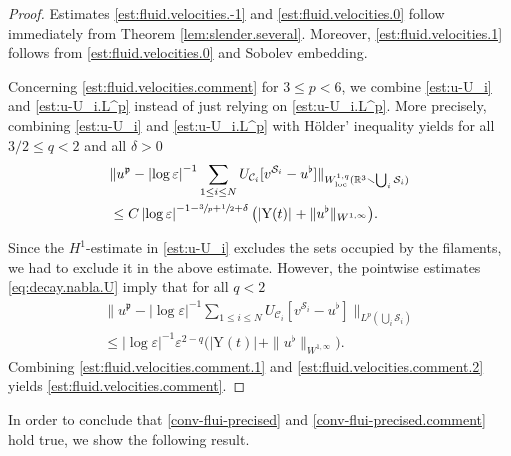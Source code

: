 \documentclass[10pt]{amsart}
\newcommand{\R}{\mathbb{R}}
\let\eps\varepsilon
\newcommand{\loc}{\mathrm{loc}}
\newcommand{\rY}{\mathrm{Y}}
\theoremstyle{definition}
\theoremstyle{remark}
\let\oldbigcup\bigcup
\begin{document}
\begin{proof}
Estimates \eqref{est:fluid.velocities.-1} and \eqref{est:fluid.velocities.0} follow immediately from Theorem \ref{lem:slender.several}. Moreover, \eqref{est:fluid.velocities.1} follows from \eqref{est:fluid.velocities.0} and Sobolev embedding.

Concerning \eqref{est:fluid.velocities.comment} for $3 \leq p < 6$,
we combine \eqref{est:u-U_i} and \eqref{est:u-U_i.L^p} instead of just relying on \eqref{est:u-U_i.L^p}.
More precisely, combining \eqref{est:u-U_i} and \eqref{est:u-U_i.L^p} with Hölder' inequality yields for all $3/2 \leq q < 2$ and all $\delta > 0$
\begin{align} \label{est:fluid.velocities.comment.1}
&\|u^\mathfrak{p} - \left|\log \eps\right|^{-1} \sum_{1 \leq i \leq N} U_{\mathcal C_i}[v^{{\mathcal S}_i} - u^\flat]\|_{W^{1,q}_{\loc}(\R^3 \smallsetminus \oldbigcup_i \mathcal S_i)}\\
&\leq C \left|\log \eps\right|^{-1 - \sfrac 3 p + \sfrac 1 2 + \delta} \big(|\rY(t)|_{} + \|u^\flat\|_{W^{1,\infty}} \big).
\end{align}

Since the $H^1$-estimate in \eqref{est:u-U_i} excludes the sets occupied by the filaments, we had to exclude it in the above estimate. However, the pointwise estimates \eqref{eq:decay.nabla.U}
imply that for all $q < 2$\vspace*{-3pt}
\begin{multline} \label{est:fluid.velocities.comment.2}
\|u^\mathfrak{p} - \left|\log \eps\right|^{-1} \sum_{1 \leq i \leq N} U_{\mathcal C_i}[v^{{\mathcal S}_i} - u^\flat]\|_{L^p(\oldbigcup_i \mathcal S_i)}\\[-5pt]
\leq \left|\log \eps\right|^{-1} \eps^{2-q} \big(|\rY(t)|_{} + \|u^\flat\|_{W^{1,\infty}} \big).
\end{multline}
Combining \eqref{est:fluid.velocities.comment.1} and \eqref{est:fluid.velocities.comment.2} yields \eqref{est:fluid.velocities.comment}.
\end{proof}
In order to conclude that \eqref{conv-flui-precised} and \eqref{conv-flui-precised.comment} hold true, we show the following result.
\end{document}
